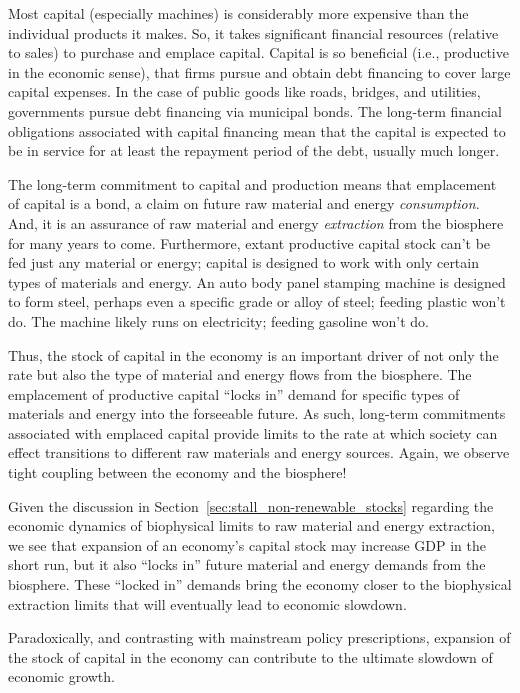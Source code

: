 Most capital (especially machines) is considerably more expensive
than the individual products it makes.
So, it takes significant financial resources (relative to sales) 
to purchase and emplace capital.
Capital is so beneficial (i.e., productive in the economic sense), 
that firms pursue and obtain debt financing to cover large capital expenses.
In the case of public goods like roads, bridges, and utilities,
governments pursue debt financing via municipal bonds.
The long-term financial obligations associated with capital financing 
mean that the capital is expected to be in service
for at least the repayment period of the debt,
usually much longer.

The long-term commitment to capital and production means that 
emplacement of capital is a bond, a claim on future
raw material and energy \emph{consumption}.
And, it is an assurance of raw material and energy \emph{extraction} 
from the biosphere for many years to come.
Furthermore, extant productive capital stock can't be fed just any material or energy;
capital is designed to work with only certain types of materials and energy.
An auto body panel stamping machine is designed to form steel, perhaps even a specific 
grade or alloy of steel;
feeding plastic won't do.
The machine likely runs on electricity; 
feeding gasoline won't do.

Thus, the stock of capital in the economy 
is an important driver of not only 
the rate but also  
the type of
material and energy flows from the biosphere.
The emplacement of productive capital
``locks in'' demand for specific types of materials and energy 
into the forseeable future.
As such, long-term commitments associated with emplaced capital
provide limits to the rate at which society can effect
transitions to different raw materials and energy sources.
Again, we observe tight coupling between the economy and the biosphere!

Given the discussion in Section~\ref{sec:stall_non-renewable_stocks}
regarding the economic dynamics 
of biophysical limits to raw material and energy extraction,
we see that expansion of an economy's capital stock may increase GDP
in the short run, 
but it also ``locks in'' 
future material and energy demands 
from the biosphere.
These ``locked in'' demands bring the economy closer 
to the biophysical extraction limits 
that will eventually lead to economic slowdown.

\begin{svgraybox}
	Paradoxically, and contrasting with mainstream policy prescriptions,
	expansion of the stock of capital in the economy 
	can contribute to the ultimate slowdown of economic growth.
\end{svgraybox}


